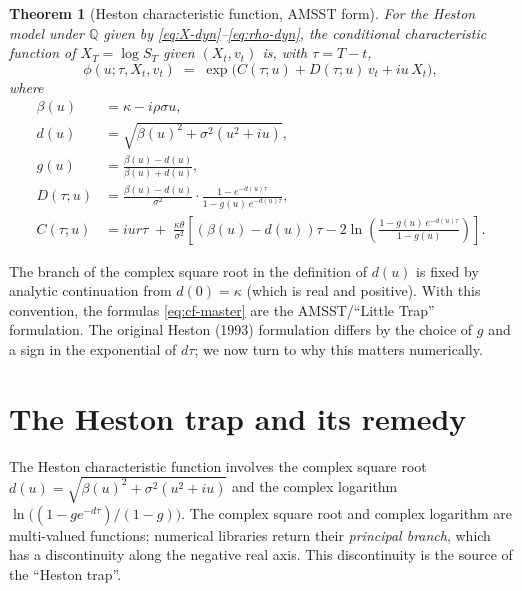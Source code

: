 \documentclass[11pt]{article}
\theoremstyle{plain}
\newtheorem{theorem}{Theorem}[section]
\theoremstyle{definition}
\theoremstyle{remark}
\begin{document}
\begin{theorem}[Heston characteristic function, AMSST form]\label{thm:heston-cf}
    For the Heston model under \(\mathbb{Q}\) given by \eqref{eq:X-dyn}--\eqref{eq:rho-dyn}, the conditional characteristic function of \(X_T = \log S_T\) given \((X_t, v_t)\) is, with \(\tau = T - t\),
    \begin{equation}
        \phi(u; \tau, X_t, v_t) \;=\; \exp\!\bigl(C(\tau; u) + D(\tau; u)\, v_t + i u\, X_t\bigr),                  \label{eq:cf-master}
    \end{equation}
    where
    \begin{align*}
        \beta(u)         &= \kappa - i \rho \sigma u, \\
        d(u)             &= \sqrt{\beta(u)^2 + \sigma^2 (u^2 + i u)}, \\
        g(u)             &= \frac{\beta(u) - d(u)}{\beta(u) + d(u)}, \\
        D(\tau; u)       &= \frac{\beta(u) - d(u)}{\sigma^2} \cdot \frac{1 - e^{-d(u) \tau}}{1 - g(u)\, e^{-d(u) \tau}}, \\
        C(\tau; u)       &= i u r \tau \;+\; \frac{\kappa\theta}{\sigma^2}\!\left[(\beta(u) - d(u))\tau - 2 \ln\!\left(\frac{1 - g(u)\, e^{-d(u) \tau}}{1 - g(u)}\right)\right].
    \end{align*}
\end{theorem}

The branch of the complex square root in the definition of \(d(u)\) is fixed by analytic continuation from \(d(0) = \kappa\) (which is real and positive). With this convention, the formulas \eqref{eq:cf-master} are the AMSST/``Little Trap'' formulation. The original Heston (1993) formulation differs by the choice of \(g\) and a sign in the exponential of \(d \tau\); we now turn to why this matters numerically.

\section{The Heston trap and its remedy}
\label{sec:trap}

The Heston characteristic function involves the complex square root \(d(u) = \sqrt{\beta(u)^2 + \sigma^2(u^2 + iu)}\) and the complex logarithm \(\ln\bigl((1 - g e^{-d\tau})/(1 - g)\bigr)\). The complex square root and complex logarithm are multi-valued functions; numerical libraries return their \emph{principal branch}, which has a discontinuity along the negative real axis. This discontinuity is the source of the ``Heston trap''.
\end{document}
